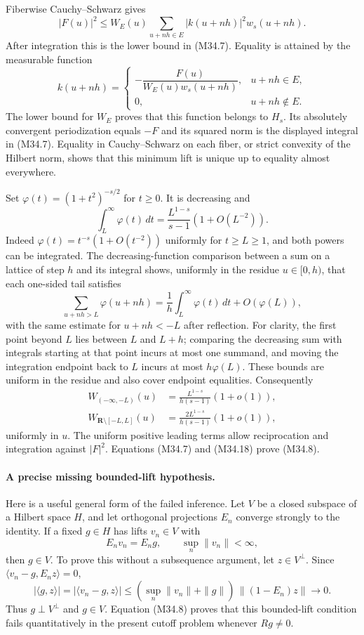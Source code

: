 Fiberwise Cauchy--Schwarz gives
\[
 |F(u)|^2\le W_E(u)
         \sum_{u+nh\in E}|k(u+nh)|^2w_s(u+nh).
 \tag{M34.14}
\]
After integration this is the lower bound in (M34.7).
Equality is attained by the measurable function
\[
 k(u+nh)=
 \begin{cases}
 -\dfrac{F(u)}{W_E(u)w_s(u+nh)},&u+nh\in E,\\[6pt]
 0,&u+nh\notin E.
 \end{cases}
 \tag{M34.15}
\]
The lower bound for $W_E$ proves that this function belongs
to $H_s$.  Its absolutely convergent periodization equals
$-F$ and its squared norm is the displayed integral in
(M34.7).  Equality in Cauchy--Schwarz on each fiber, or
strict convexity of the Hilbert norm, shows that this
minimum lift is unique up to equality almost everywhere.

Set $\varphi(t)=(1+t^2)^{-s/2}$ for $t\ge0$.
It is decreasing and
\[
 \int_L^\infty\varphi(t)\,dt
           =\frac{L^{1-s}}{s-1}(1+O(L^{-2})).
 \tag{M34.16}
\]
Indeed $\varphi(t)=t^{-s}(1+O(t^{-2}))$ uniformly for
$t\ge L\ge1$, and both powers can be integrated.
The decreasing-function comparison between a sum on a
lattice of step $h$ and its integral shows, uniformly in
the residue $u\in[0,h)$, that each one-sided tail satisfies
\[
 \sum_{u+nh>L}\varphi(u+nh)
   =\frac1h\int_L^\infty\varphi(t)\,dt+O(\varphi(L)),
 \tag{M34.17}
\]
with the same estimate for $u+nh<-L$ after reflection.
For clarity, the first point beyond $L$ lies between $L$
and $L+h$; comparing the decreasing sum with integrals
starting at that point incurs at most one summand, and
moving the integration endpoint back to $L$ incurs at
most $h\varphi(L)$.  These bounds are uniform in the
residue and also cover endpoint equalities.
Consequently
\[
 \begin{split}
 W_{(-\infty,-L)}(u)
    &=\frac{L^{1-s}}{h(s-1)}(1+o(1)),\\
 W_{\mathbf R\setminus[-L,L]}(u)
    &=\frac{2L^{1-s}}{h(s-1)}(1+o(1)),
 \end{split}
 \tag{M34.18}
\]
uniformly in $u$.  The uniform positive leading terms
allow reciprocation and integration against $|F|^2$.
Equations (M34.7) and (M34.18) prove (M34.8).

\paragraph{A precise missing bounded-lift hypothesis.}
Here is a useful general form of the failed inference.
Let $V$ be a closed subspace of a Hilbert space $H$, and
let orthogonal projections $E_n$ converge strongly to the
identity.  If a fixed $g\in H$ has lifts $v_n\in V$ with
\[
                 E_nv_n=E_ng,\qquad
                            \sup_n\|v_n\|<\infty,
 \tag{M34.19}
\]
then $g\in V$.  To prove this without a subsequence
argument, let $z\in V^\perp$.  Since
$\langle v_n-g,E_nz\rangle=0$,
\[
 |\langle g,z\rangle|
  =|\langle v_n-g,z\rangle|
  \le(\sup_n\|v_n\|+\|g\|)\,\|(1-E_n)z\|
          \longrightarrow0.
 \tag{M34.20}
\]
Thus $g\perp V^\perp$ and $g\in V$.  Equation (M34.8)
proves that this bounded-lift condition fails quantitatively
in the present cutoff problem whenever $Rg\ne0$.

